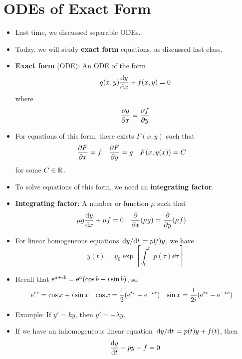 \documentclass[../notes.tex]{subfiles}
\begin{document}
\section{ODEs of Exact Form}
\begin{itemize}
    \item {}Last time, we discussed separable ODEs.
    \item Today, we will study \textbf{exact form} equations, as discussed last class.
    \item \textbf{Exact form} (ODE): An ODE of the form
    \begin{equation*}
        g(x,y)\dv{y}{x}+f(x,y) = 0
    \end{equation*}
    where
    \begin{equation*}
        \pdv{g}{x} = \pdv{f}{y}
    \end{equation*}
    \item For equations of this form, there exists $F(x,y)$ such that
    \begin{align*}
        \pdv{F}{x} &= f&
        \pdv{F}{y} &= g&
        F(x,y(x)) &= C
    \end{align*}
    for some $C\in\R$.
    \item To solve equations of this form, we need an \textbf{integrating factor}.
    \item \textbf{Integrating factor}: A number or function $\mu$ such that
    \begin{align*}
        \mu g\dv{y}{x}+\mu f &= 0&
        \pdv{x}(\mu g) &= \pdv{y}(\mu f)
    \end{align*}
    \item For linear homogeneous equations $\dv*{y}{t}=p(t)y$, we have
    \begin{equation*}
        y(t) = y_0\exp[\int_{t_0}^tp(\tau)\dd\tau]
    \end{equation*}
    \item Recall that $\e[a+ib]=\e[a](\cos b+i\sin b)$, so
    \begin{align*}
        \e[ix] &= \cos x+i\sin x&
        \cos x &= \frac{1}{2}(\e[ix]+\e[-ix])&
        \sin x &= \frac{1}{2i}(\e[ix]-\e[-ix])
    \end{align*}
    \item Example: If $y'=ky$, then $y'=-\lambda y$.
    \item If we have an inhomogeneous linear equation $\dv*{y}{t}=p(t)y+f(t)$, then
    \begin{equation*}
        \dv{y}{t}-py-f = 0
    \end{equation*}

\end{itemize}
\end{document}
